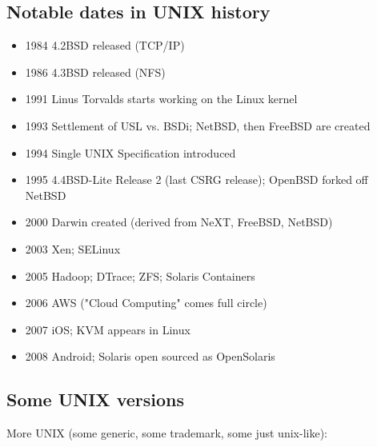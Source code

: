 \documentclass[sxga]{xdvislides}
\begin{document}
\subsection{Notable dates in UNIX history}
\begin{itemize}
	\item 1984 4.2BSD released (TCP/IP)
	\item 1986 4.3BSD released (NFS)
	\item 1991 Linus Torvalds starts working on the Linux kernel
	\item 1993 Settlement of USL vs. BSDi; NetBSD, then FreeBSD are created
	\item 1994 Single UNIX Specification introduced
	\item 1995 4.4BSD-Lite Release 2 (last CSRG release); OpenBSD
		forked off NetBSD
	\item 2000 Darwin created (derived from NeXT, FreeBSD, NetBSD)
	\item 2003 Xen; SELinux
	\item 2005 Hadoop; DTrace; ZFS; Solaris Containers
	\item 2006 AWS ("Cloud Computing" comes full circle)
	\item 2007 iOS; KVM appears in Linux
	\item 2008 Android; Solaris open sourced as OpenSolaris
\end{itemize}

\subsection{Some UNIX versions}
More UNIX (some generic, some trademark, some just unix-like):
\\
\end{document}

